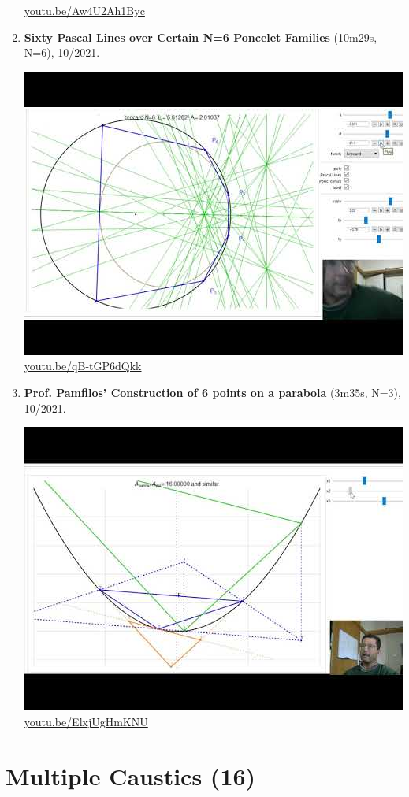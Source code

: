 \documentclass[12pt]{amsart}
\begin{document}
\begin{enumerate}[resume]
\begin{center}
\href{https://youtu.be/Aw4U2Ah1Byc}{\url{youtu.be/Aw4U2Ah1Byc}}\end{center}
% 
\item \textbf{Sixty Pascal Lines over Certain N=6 Poncelet Families} (10m29s, N=6), 10/2021. 
\begin{center}\includegraphics[width=.5\textwidth]{pics/qB-tGP6dQkk.jpg} \\ 
\href{https://youtu.be/qB-tGP6dQkk}{\url{youtu.be/qB-tGP6dQkk}}\end{center}
% 
\item \textbf{Prof. Pamfilos' Construction of 6 points on a parabola} (3m35s, N=3), 10/2021. 
\begin{center}\includegraphics[width=.5\textwidth]{pics/ElxjUgHmKNU.jpg} \\ 
\href{https://youtu.be/ElxjUgHmKNU}{\url{youtu.be/ElxjUgHmKNU}}\end{center}
% 
\end{enumerate}

\section{Multiple Caustics (16)}
\end{document}
